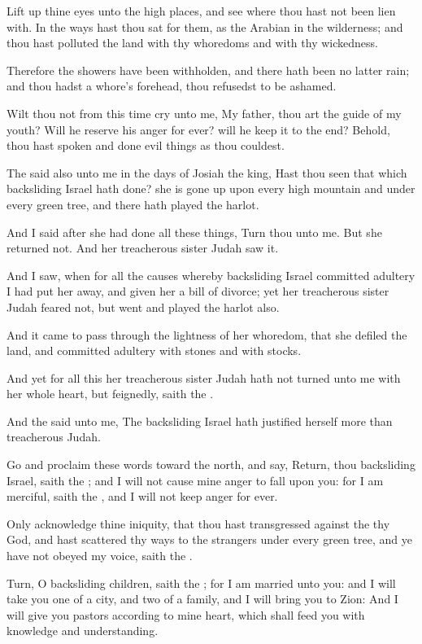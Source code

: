 \Verse Lift up thine eyes unto the high places, and see where thou hast not been lien with. In the ways hast thou sat for them, as the Arabian in the wilderness; and thou hast polluted the land with thy whoredoms and with thy wickedness.

\Verse Therefore the showers have been withholden, and there hath been no latter rain; and thou hadst a whore's forehead, thou refusedst to be ashamed.

\Verse Wilt thou not from this time cry unto me, My father, thou art the guide of my youth?  \Verse Will he reserve his anger for ever? will he keep it to the end?  Behold, thou hast spoken and done evil things as thou couldest.

\Verse The \LORD said also unto me in the days of Josiah the king, Hast thou seen that which backsliding Israel hath done? she is gone up upon every high mountain and under every green tree, and there hath played the harlot.

\Verse And I said after she had done all these things, Turn thou unto me.  But she returned not. And her treacherous sister Judah saw it.

\Verse And I saw, when for all the causes whereby backsliding Israel committed adultery I had put her away, and given her a bill of divorce; yet her treacherous sister Judah feared not, but went and played the harlot also.

\Verse And it came to pass through the lightness of her whoredom, that she defiled the land, and committed adultery with stones and with stocks.

\Verse And yet for all this her treacherous sister Judah hath not turned unto me with her whole heart, but feignedly, saith the \LORD.

\Verse And the \LORD said unto me, The backsliding Israel hath justified herself more than treacherous Judah.

\Verse Go and proclaim these words toward the north, and say, Return, thou backsliding Israel, saith the \LORD; and I will not cause mine anger to fall upon you: for I am merciful, saith the \LORD, and I will not keep anger for ever.

\Verse Only acknowledge thine iniquity, that thou hast transgressed against the \LORD thy God, and hast scattered thy ways to the strangers under every green tree, and ye have not obeyed my voice, saith the \LORD.

\Verse Turn, O backsliding children, saith the \LORD; for I am married unto you: and I will take you one of a city, and two of a family, and I will bring you to Zion: \Verse And I will give you pastors according to mine heart, which shall feed you with knowledge and understanding.

